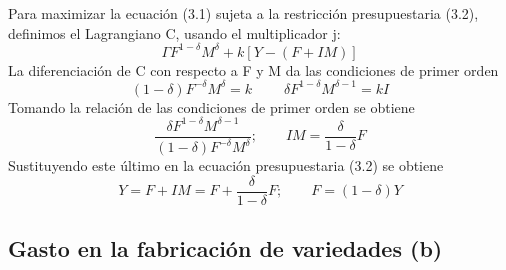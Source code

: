 \begin{nota}
    Para maximizar la ecuación (3.1) sujeta a la restricción presupuestaria (3.2), definimos el Lagrangiano C, usando el multiplicador j:
    $$\Gamma F^{1-\delta}M^\delta + k[Y-(F+IM)]$$
    La diferenciación de C con respecto a F y M da las condiciones de primer orden
    $$(1-\delta)F^{-\delta}M^\delta = k\; \qquad \delta F^{1-\delta}M^{\delta-1}=kI$$
    Tomando la relación de las condiciones de primer orden se obtiene
    $$\dfrac{\delta F^{1-\delta} M^{\delta - 1}}{(1-\delta)F^{-\delta}M^\delta};\qquad IM = \dfrac{\delta}{1-\delta}F$$
    Sustituyendo este último en la ecuación presupuestaria (3.2) se obtiene
    $$Y=F+IM = F+\dfrac{\delta}{1-\delta}F;\qquad F=(1-\delta)Y$$
\end{nota}

\subsection{Gasto en la fabricación de variedades (b)}



